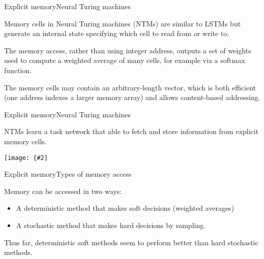 \documentclass{beamer}
\newcommand{\myfig}[3]{\centerline{\texttt{[image: \{\#2]}}}
    \centerline{\scriptsize #3}}
\begin{document}
\begin{frame}{Explicit memory}{Neural Turing machines}

  Memory cells in \alert{Neural Turing machines (NTMs)} are similar to
  LSTMs but generate an internal state specifying \alert{which cell
    to read from or write to}.

  \medskip

  The memory access, rather than using integer address, outputs a set
  of weights used to compute a weighted average of many cells, for example
  via a softmax function.

  \medskip

  The memory cells may contain an arbitrary-length vector, which is
  both \alert{efficient} (one address indexes a larger memory array)
  and allows \alert{content-based addressing}.

\end{frame}


\begin{frame}{Explicit memory}{Neural Turing machines}

  NTMs learn a \alert{task network} that able to fetch and store information
  from explicit memory cells.

  \medskip
  
  \myfig{2in}{goodfellow-fig10-18}{Goodfellow, Bengio, and Courville (2016), Fig.\ 10.18}

\end{frame}


\begin{frame}{Explicit memory}{Types of memory access}

  Memory can be accessed in two ways:
  \begin{itemize}
  \item A \alert{deterministic} method that makes \alert{soft}
    decisions (weighted averages)
  \item A \alert{stochastic} method that makes \alert{hard} decisions
    by sampling.
  \end{itemize}
  
  Thus far, deterministic soft methods seem to perform better than
  hard stochastic methods.
  
\end{frame}

  
\end{document}
